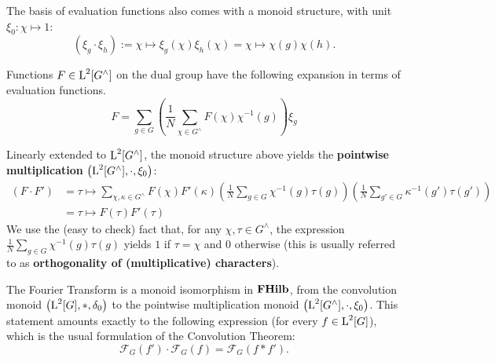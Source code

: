 The basis of evaluation functions also comes with a monoid structure, with unit $\xi_0: \chi \mapsto 1$:
\begin{equation*}
  \left(\xi_g\cdot\xi_h\right):= \chi \mapsto \xi_g(\chi)\xi_h(\chi) = \chi \mapsto \chi(g)\chi(h).
\end{equation*}

Functions $F \in \operatorname{L}^2[G^\wedge]$ on the dual group have the following expansion in terms of evaluation functions.
\begin{equation*}
  F = \sum_{g\in G} \left( \frac{1}{N}\sum_{\chi \in G^\wedge} F(\chi) \chi^{-1}(g) \right) \xi_g
\end{equation*}

Linearly extended to $\operatorname{L}^2[G^\wedge]$, the monoid structure above yields the \textbf{pointwise multiplication} $\left( \operatorname{L}^2[G^\wedge],\cdot,\xi_0 \right)$: 
\begin{align}
\label{eqn:PointwiseMultCharacters}
  \left(F \cdot F' \right) &= \tau \mapsto \sum_{\chi,\kappa \in G^\wedge}  F(\chi)  F'(\kappa) \left(\frac{1}{N} \sum_{g\in G} \chi^{-1}(g)\tau(g)\right) \left(\frac{1}{N} \sum_{g'\in G}\kappa^{-1}(g') \tau(g') \right) \\ &= \tau \mapsto F(\tau) F'(\tau)
\end{align}
We use the (easy to check) fact that, for any $\chi,\tau \in G^\wedge$, the expression $\frac{1}{N} \sum_{g\in G}\chi^{-1}(g) \tau(g)$ yields $1$ if $\tau = \chi$ and $0$ otherwise (this is usually referred to as \textbf{orthogonality of (multiplicative) characters}).

\begin{theorem}
The Fourier Transform is a monoid isomorphism in $\mathbf{FHilb}$, from the convolution monoid $\left( \operatorname{L}^2[G],*,\delta_0 \right)$ to the pointwise multiplication monoid $\left( \operatorname{L}^2[G^\wedge],\cdot, \xi_0 \right)$. This statement amounts exactly to the following expression (for every $f\in \operatorname{L}^2[G]$), which is the usual formulation of the Convolution Theorem: 
\begin{equation}\label{eqn:ConvolutionTheorem}
  \mathcal{F}_G (f') \cdot \mathcal{F}_G (f) = \mathcal{F}_G (f * f').
\end{equation}
\end{theorem}

